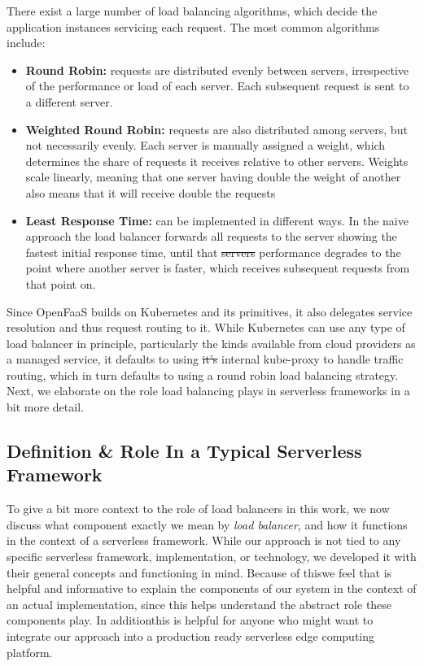 \documentclass[draft,final]{vutinfth} %
\providecommand{\DIFaddtex}[1]{{\protect\color{blue}\uwave{#1}}} %
\providecommand{\DIFdeltex}[1]{{\protect\color{red}\sout{#1}}}                      %
\providecommand{\DIFaddbegin}{} %
\providecommand{\DIFaddend}{} %
\providecommand{\DIFdelbegin}{} %
\providecommand{\DIFdelend}{} %
\providecommand{\DIFadd}[1]{\texorpdfstring{\DIFaddtex{#1}}{#1}} %
\providecommand{\DIFdel}[1]{\texorpdfstring{\DIFdeltex{#1}}{}} %
\begin{document}
There exist a large number of load balancing algorithms, which decide the application instances servicing each request.
The most common algorithms include:
\begin{itemize}
    \item \textbf{Round Robin:} requests are distributed evenly between servers, irrespective of the performance or load of each server. Each subsequent request is sent to a different server.
    \item \textbf{Weighted Round Robin:} requests are also distributed among servers, but not necessarily evenly. Each server is manually assigned a weight, which determines the share of requests it receives relative to other servers. Weights scale linearly, meaning that one server having double the weight of another also means that it will receive double the requests
    \item \textbf{Least Response Time:} can be implemented in different ways. In the naive approach the load balancer forwards all requests to the server showing the fastest initial response time, until that \DIFdelbegin \DIFdel{servers }\DIFdelend \DIFaddbegin \DIFadd{server's }\DIFaddend performance degrades to the point where another server is faster, which receives subsequent requests from that point on.
\end{itemize}

Since OpenFaaS\cite{openfaas} builds on Kubernetes and its primitives, it also delegates service resolution and thus request routing to it.
While Kubernetes can use any type of load balancer in principle, particularly the kinds available from cloud providers as a managed service, it defaults to using \DIFdelbegin \DIFdel{it's }\DIFdelend \DIFaddbegin \DIFadd{its }\DIFaddend internal kube-proxy to handle traffic routing, which in turn defaults to using a round robin load balancing strategy.
Next, we elaborate on the role load balancing plays in serverless frameworks in a bit more detail.


\subsection{ Definition \& Role In a Typical Serverless Framework}
To give a bit more context to the role of load balancers in this work, we now discuss what component exactly we mean by \textit{load balancer}, and how it functions in the context of a serverless framework. While our approach is not tied to any specific serverless framework, implementation, or technology, we developed it with their general concepts and functioning in mind. Because of this\DIFaddbegin \DIFadd{, }\DIFaddend we feel that is helpful and informative to explain the components of our system in the context of an actual implementation, since this helps understand the abstract role these components play. In addition\DIFaddbegin \DIFadd{, }\DIFaddend this is helpful for anyone who might want to integrate our approach into a production ready serverless edge computing platform.
\end{document}
